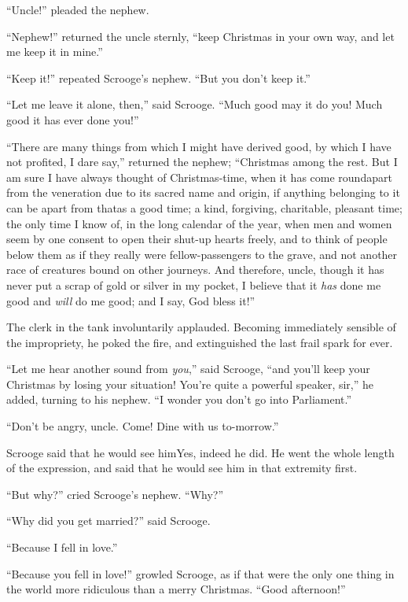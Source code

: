\documentclass[paper=5.5in:8.5in,BCOR=5mm,twoside,DIV=calc,12pt,usegeometry]{scrbook} %
\begin{document}
\enquote{Uncle!} pleaded the nephew.

\enquote{Nephew!} returned the uncle sternly, \enquote{keep Christmas in your own way, and let me keep it in mine.}

\enquote{Keep it!} repeated Scrooge's nephew. \enquote{But you don't keep it.}

\enquote{Let me leave it alone, then,} said Scrooge. \enquote{Much good may it do you! Much good it has ever done you!}

\enquote{There are many things from which I might have derived good, by which I have not profited, I dare say,} returned the nephew; \enquote{Christmas among the rest. But I am sure I have always thought of Christmas-time, when it has come round\textemdash apart from the veneration due to its sacred name and origin, if anything belonging to it can be apart from that\textemdash as a good time; a kind, forgiving, charitable, pleasant time; the only time I know of, in the long calendar of the year, when men and women seem by one consent to open their shut-up hearts freely, and to think of people below them as if they really were fellow-passengers to the grave, and not another race of creatures bound on other journeys. And therefore, uncle, though it has never put a scrap of gold or silver in my pocket, I believe that it \textit{has} done me good and \textit{will} do me good; and I say, God bless it!}

The clerk in the tank involuntarily applauded. Becoming immediately sensible of the impropriety, he poked the fire, and extinguished the last frail spark for ever.

\enquote{Let me hear another sound from \textit{you},} said Scrooge, \enquote{and you'll keep your Christmas by losing your situation! You're quite a powerful speaker, sir,} he added, turning to his nephew. \enquote{I wonder you don't go into Parliament.}

\enquote{Don't be angry, uncle. Come! Dine with us to-morrow.}

Scrooge said that he would see him\textemdash \textemdash Yes, indeed he did. He went the whole length of the expression, and said that he would see him in that extremity first.

\enquote{But why?} cried Scrooge's nephew. \enquote{Why?}

\enquote{Why did you get married?} said Scrooge.

\enquote{Because I fell in love.}

\enquote{Because you fell in love!} growled Scrooge, as if that were the only one thing in the world more ridiculous than a merry Christmas. \enquote{Good afternoon!}
\end{document}
